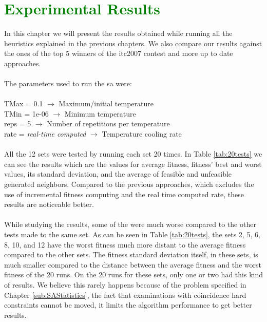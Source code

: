 \chapter{\textcolor{green}{Experimental Results}}
\label{chap:ExpResults}

In this chapter we will present the results obtained while running all the heuristics explained in the previous chapters. We also compare our results against the ones of the top 5 winners of the \gls{itc2007} contest and more up to date approaches.\\
\\
The parameters used to run the \gls{sa} were:\\
\\
TMax = 0.1 $\rightarrow$ Maximum/initial temperature\\
TMin = 1e-06 $\rightarrow$ Minimum temperature\\
reps = 5 $\rightarrow$ Number of repetitions per temperature\\
rate = \textit{real-time computed} $\rightarrow$ Temperature cooling rate\\
\\
All the 12 sets were tested by running each set 20 times. In Table \ref{tab:20tests} we can see the results which are the values for average fitness, fitness' best and worst values, its standard deviation, and the average of feasible and unfeasible generated neighbors. Compared to the previous approaches, which excludes the use of incremental fitness computing and the real time computed rate, these results are noticeable better. \\
\\
While studying the results, some of the were much worse compared to the other tests made to the same set. As can be seen in Table \ref{tab:20tests}, the sets 2, 5, 6, 8, 10, and 12 have the worst fitness much more distant to the average fitness compared to the other sets. The fitness standard deviation itself, in these sets, is much smaller compared to the distance between the average fitness and the worst fitness of the 20 runs. On the 20 runs for these sets, only one or two had this kind of results. We believe this rarely happens because of the problem specified in Chapter \ref{sub:SAStatistics}, the fact that examinations with coincidence hard constraints cannot be moved, it limits the algorithm performance to get better results.\\
\\
